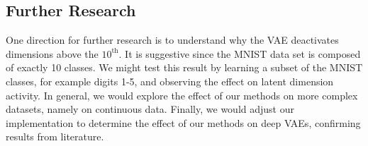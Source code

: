 \documentclass{article} %
\numberwithin{figure}{section}
\begin{document}
\subsection{Further Research}
One direction for further research is to understand why the VAE deactivates dimensions above the $10^{\text{th}}$. It is suggestive since the MNIST data set is composed of exactly 10 classes. We might test this result by learning a subset of the MNIST classes, for example digits 1-5, and observing the effect on latent dimension activity. In general, we would explore the effect of our methods on more complex datasets, namely on continuous data. Finally, we would adjust our implementation to determine the effect of our methods on deep VAEs, confirming results from literature.



\end{document}
